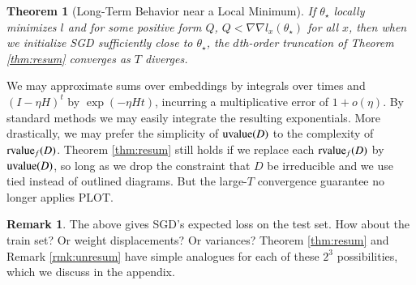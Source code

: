\documentclass{article}
\theoremstyle{plain}
\newtheorem{thm}{Theorem}
\theoremstyle{definition}
\newtheorem{rmk}{Remark}
\newcommand{\uvalue}{\text{\textnormal{uvalue}}}
\newcommand{\rvalue}{\text{\textnormal{rvalue}}}
\begin{document}
        \begin{thm}[Long-Term Behavior near a Local Minimum] \label{thm:converge}
            If $\theta_\star$ locally minimizes $l$ and for some positive form
            $Q$, $Q < \nabla\nabla l_x(\theta_\star)$ for all $x$, then when we
            initialize SGD sufficiently close to $\theta_\star$, the
            $d$th-order truncation of Theorem \ref{thm:resum} converges as $T$
            diverges.
        \end{thm}

 
            We may approximate sums over embeddings by integrals over
            times and $(I-\eta H)^t$ by $\exp(- \eta H t)$, incurring a
            multiplicative error of $1 + o(\eta)$.  By standard methods we
            may easily integrate the resulting exponentials.
            More drastically, we may prefer the simplicity of $\uvalue(D)$ to
            the complexity of $\rvalue_f(D)$.  Theorem \ref{thm:resum} still
            holds if we replace each $\rvalue_f(D)$ by $\uvalue(D)$, so long as
            we drop the constraint that $D$ be irreducible and we use tied
            instead of outlined diagrams.  But the large-$T$
            convergence guarantee no longer applies {\color{red} PLOT}.

        
        \begin{rmk}
            The above gives SGD's expected loss on the test set.  How about
            the train set?  Or weight displacements?  Or variances?
            Theorem \ref{thm:resum} and Remark \ref{rmk:unresum} have simple
            analogues for each of these $2^3$ possibilities, which we discuss
            in the appendix. 
        \end{rmk}
\end{document}
